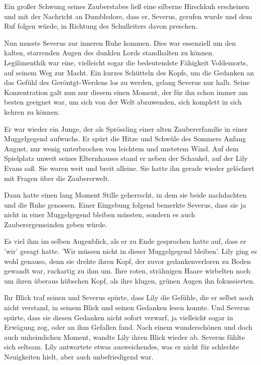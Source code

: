 \documentclass[fontsize=12pt]{scrartcl}
\begin{document}
	Ein großer Schwung seines Zauberstabes ließ eine silberne Hirschkuh erscheinen und mit der Nachricht an Dumbledore, dass er, Severus, gerufen wurde und dem Ruf folgen würde, in Richtung des Schulleiters davon preschen.
	
	Nun musste Severus zur inneren Ruhe kommen. Dies war essenziell um den kalten, starrenden Augen des dunklen Lords standhalten zu können. 
	Legilimenthik war eine, vielleicht sogar die bedeutendste Fähigkeit Voldemorts, auf seinem Weg zur Macht. Ein kurzes Schütteln des Kopfs, um die Gedanken an das Gefühl des Geröntgt-Werdens los zu werden, gelang Severus nur halb.
	Seine Konzentration galt nun nur diesem einen Moment, der für ihn schon immer am besten geeignet war, um sich von der Welt abzuwenden, sich komplett in sich kehren zu können. 
	
	
	Er war wieder ein Junge, der als Sprössling einer alten Zaubererfamilie in einer Muggelgegend aufwuchs. Er spürt die Hitze und Schwüle des Sommers Anfang August, nur wenig unterbrochen von leichtem und unstetem Wind.
	Auf dem Spielplatz unweit seines Elternhauses stand er neben der Schaukel, auf der Lily Evans saß. Sie waren weit und breit alleine. Sie hatte ihn gerade wieder gelöchert mit Fragen über die Zaubererwelt.
	
	Dann hatte einen lang Moment Stille geherrscht, in dem sie beide nachdachten und die Ruhe genossen. Einer Eingebung folgend bemerkte Severus, dass sie ja nicht in einer Muggelgegend bleiben müssten, sondern es auch Zauberergemeinden geben würde. 
	
	Es viel ihm im selben Augenblick, als er zu Ende gesprochen hatte auf, dass er 'wir' gesagt hatte. 'Wir müssen nicht in dieser Muggelgegend bleiben'. 
	Lily ging es wohl genauso, denn sie drehte ihren Kopf, der zuvor gedankenverloren zu Boden gewandt war, ruckartig zu ihm um. Ihre roten, strähnigen Haare wirbelten noch um ihren überaus hübschen Kopf, als ihre klugen, grünen Augen ihn fokussierten.
	
	Ihr Blick traf seinen und Severus spürte, dass Lily die Gefühle, die er selbst noch nicht verstand, in seinem Blick und seinen Gedanken lesen konnte. 
	Und Severus spürte, dass sie diesen Gedanken nicht sofort verwarf, ja vielleicht sogar in Erwägung zog, oder an ihm Gefallen fand. 
	Nach einem wunderschönen und doch auch unheimlichen Moment, wandte Lily ihren Blick wieder ab. Severus fühlte sich seltsam. 
	Lily antwortete etwas ausweichendes, was er nicht für schlechte Neuigkeiten hielt, aber auch unbefriedigend war. 
	
\end{document}
